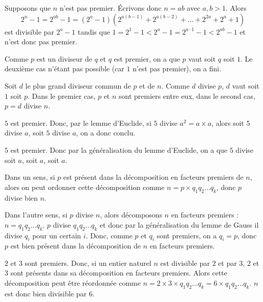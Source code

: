 \begin{sol}
Supposons que $n$ n'est pas premier. Écrivons donc $n = ab$ avec $a, b > 1$. Alors
$$2^n - 1 = 2^{ab} - 1 = (2^a - 1)(2^{a(b - 1)} + 2^{a(b - 2)} + \dots + 2^{2a} + 2^a + 1)$$
est divisible par $2^a - 1$ tandis que $1 = 2^1 - 1 < 2^a - 1 = 2^{a\cdot 1} - 1 < 2^{ab} - 1$ et n'est donc pas premier.
\end{sol}


\begin{sol}
Comme $p$ est un diviseur de $q$ et $q$ est premier, on a que $p$ vaut soit $q$ soit $1$. Le deuxième cas n'étant pas possible (car $1$ n'est pas premier), on a fini.
\end{sol}


\begin{sol}
Soit $d$ le plus grand diviseur commun de $p$ et de $n$. Comme $d$ divise $p$, $d$ vaut soit $1$ soit $p$. Dans le premier cas, $p$ et $n$ sont premiers entre eux, dans le second cas, $p = d$ divise $n$.
\end{sol}


\begin{sol}
$5$ est premier. Donc, par le lemme d'Euclide, si $5$ divise $a^2 = a \times a$, alors soit $5$ divise $a$, soit $5$ divise $a$, on a donc conclu.
\end{sol}


\begin{sol}
$5$ est premier. Donc par la généralisation du lemme d'Euclide, on a que $5$ divise soit $a$, soit $a$, soit $a$.
\end{sol}


\begin{sol}
Dans un sens, si $p$ est présent dans la décomposition en facteurs premiers de $n$, alors on peut ordonner cette décomposition comme $n = p \times q_1 q_2 \dots q_k$, donc $p$ divise bien $n$.

Dans l'autre sens, si $p$ divise $n$, alors décomposons $n$ en facteurs premiers : $n = q_1 q_2 \dots q_k$. $p$ divise $q_1 q_2 \dots q_k$ et donc par la généralisation du lemme de Gauss il divise $q_i$ pour un certain $i$. Donc, comme $p$ et $q_i$ sont premiers, on a $q_i = p$, donc $p$ est bien présent dans la décomposition de $n$ en facteurs premiers.
\end{sol}


\begin{sol}
$2$ et $3$ sont premiers. Donc, si un entier naturel $n$ est divisible par $2$ et par $3$, $2$ et $3$ sont présents dans sa décomposition en facteurs premiers. Alors cette décomposition peut être réordonnée comme $n = 2 \times 3 \times q_1 q_2 \dots q_k = 6 \times q_1 q_2 \dots q_k$. $n$ est donc bien divisible par $6$.
\end{sol}


